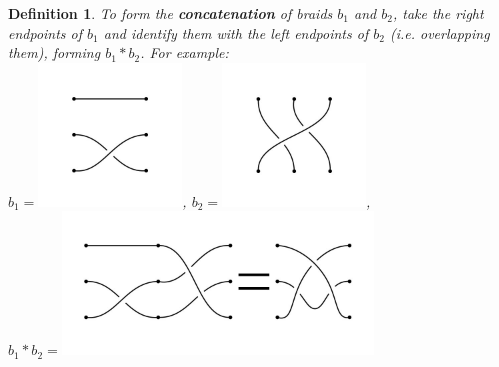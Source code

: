 \documentclass[12 pt]{article}
\newtheorem{definition}{Definition}
\begin{document}
\newpage
\begin{definition}
	To form the \textbf{concatenation} of braids $b_1$ and $b_2$, take the right endpoints of $b_1$ and identify them with the left endpoints of $b_2$  (i.e. overlapping them), forming $b_1*b_2$. For example:\\
	$b_1 = $\includegraphics*[height = 1.5in]{concat_b1}, $b_2 = $\includegraphics*[height = 1.5in]{concat_b2},\\
	$b_1 * b_2 = $\includegraphics*[height = 1.5in]{concat_b1b2}
\end{definition}
\end{document}
